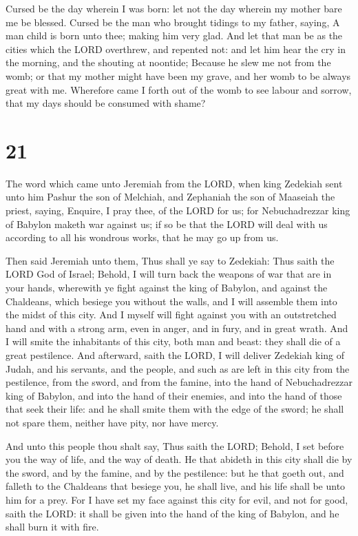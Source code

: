  Cursed be the day wherein I was born: let not the day
wherein my mother bare me be blessed.  Cursed be the man
who brought tidings to my father, saying, A man child is born unto thee;
making him very glad.  And let that man be as the cities
which the LORD overthrew, and repented not: and let him hear the cry in
the morning, and the shouting at noontide;  Because he slew
me not from the womb; or that my mother might have been my grave, and
her womb to be always great with me.  Wherefore came I
forth out of the womb to see labour and sorrow, that my days should be
consumed with shame?

\hypertarget{section-20}{%
\section{21}\label{section-20}}

 The word which came unto Jeremiah from the LORD, when king
Zedekiah sent unto him Pashur the son of Melchiah, and Zephaniah the son
of Maaseiah the priest, saying,  Enquire, I pray thee, of
the LORD for us; for Nebuchadrezzar king of Babylon maketh war against
us; if so be that the LORD will deal with us according to all his
wondrous works, that he may go up from us.

 Then said Jeremiah unto them, Thus shall ye say to
Zedekiah:  Thus saith the LORD God of Israel; Behold, I will
turn back the weapons of war that are in your hands, wherewith ye fight
against the king of Babylon, and against the Chaldeans, which besiege
you without the walls, and I will assemble them into the midst of this
city.  And I myself will fight against you with an
outstretched hand and with a strong arm, even in anger, and in fury, and
in great wrath.  And I will smite the inhabitants of this
city, both man and beast: they shall die of a great pestilence.
 And afterward, saith the LORD, I will deliver Zedekiah king
of Judah, and his servants, and the people, and such as are left in this
city from the pestilence, from the sword, and from the famine, into the
hand of Nebuchadrezzar king of Babylon, and into the hand of their
enemies, and into the hand of those that seek their life: and he shall
smite them with the edge of the sword; he shall not spare them, neither
have pity, nor have mercy.

 And unto this people thou shalt say, Thus saith the LORD;
Behold, I set before you the way of life, and the way of death.
 He that abideth in this city shall die by the sword, and by
the famine, and by the pestilence: but he that goeth out, and falleth to
the Chaldeans that besiege you, he shall live, and his life shall be
unto him for a prey.  For I have set my face against this
city for evil, and not for good, saith the LORD: it shall be given into
the hand of the king of Babylon, and he shall burn it with fire.

